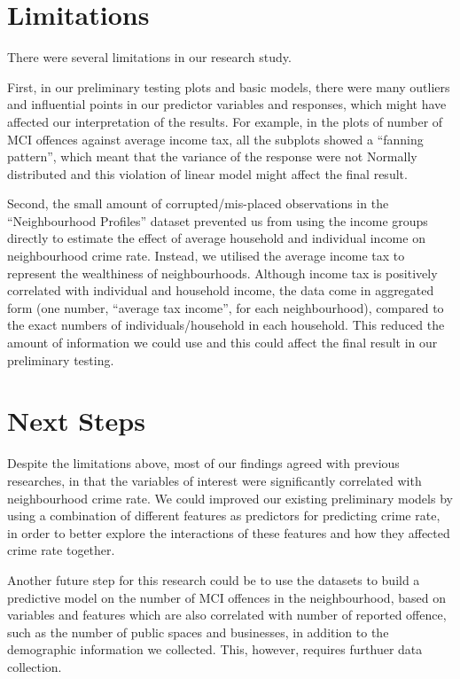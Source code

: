 \documentclass[
]{article}
\begin{document}
\hypertarget{limitations}{%
\section{Limitations}\label{limitations}}

There were several limitations in our research study.

First, in our preliminary testing plots and basic models, there were
many outliers and influential points in our predictor variables and
responses, which might have affected our interpretation of the results.
For example, in the plots of number of MCI offences against average
income tax, all the subplots showed a ``fanning pattern'', which meant
that the variance of the response were not Normally distributed and this
violation of linear model might affect the final result.

Second, the small amount of corrupted/mis-placed observations in the
``Neighbourhood Profiles'' dataset prevented us from using the income
groups directly to estimate the effect of average household and
individual income on neighbourhood crime rate. Instead, we utilised the
average income tax to represent the wealthiness of neighbourhoods.
Although income tax is positively correlated with individual and
household income, the data come in aggregated form (one number,
``average tax income'', for each neighbourhood), compared to the exact
numbers of individuals/household in each household. This reduced the
amount of information we could use and this could affect the final
result in our preliminary testing.

\hypertarget{next-steps}{%
\section{Next Steps}\label{next-steps}}

Despite the limitations above, most of our findings agreed with previous
researches, in that the variables of interest were significantly
correlated with neighbourhood crime rate. We could improved our existing
preliminary models by using a combination of different features as
predictors for predicting crime rate, in order to better explore the
interactions of these features and how they affected crime rate
together.

Another future step for this research could be to use the datasets to
build a predictive model on the number of MCI offences in the
neighbourhood, based on variables and features which are also correlated
with number of reported offence, such as the number of public spaces and
businesses, in addition to the demographic information we collected.
This, however, requires furthuer data collection.
\end{document}
